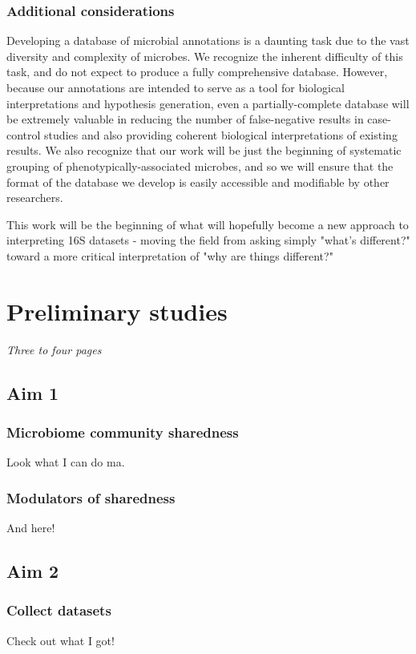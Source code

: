 \documentclass[12pt]{article}
\begin{document}
\subsubsection{Additional considerations}
Developing a database of microbial annotations is a daunting task due to the vast diversity and complexity of microbes. We recognize the inherent difficulty of this task, and do not expect to produce a fully comprehensive database. However, because our annotations are intended to serve as a tool for biological interpretations and hypothesis generation, even a partially-complete database will be extremely valuable in reducing the number of false-negative results in case-control studies and also providing coherent biological interpretations of existing results. We also recognize that our work will be just the beginning of systematic grouping of phenotypically-associated microbes, and so we will ensure that the format of the database we develop is easily accessible and modifiable by other researchers.

This work will be the beginning of what will hopefully become a new approach to interpreting 16S datasets - moving the field from asking simply "what's different?" toward a more critical interpretation of "why are things different?"

\section{Preliminary studies}
\textit{Three to four pages}

\subsection{Aim 1}
\subsubsection{Microbiome community sharedness}
Look what I can do ma.

\subsubsection{Modulators of sharedness}
And here!

\subsection{Aim 2}
\subsubsection{Collect datasets}
Check out what I got!
\end{document}
